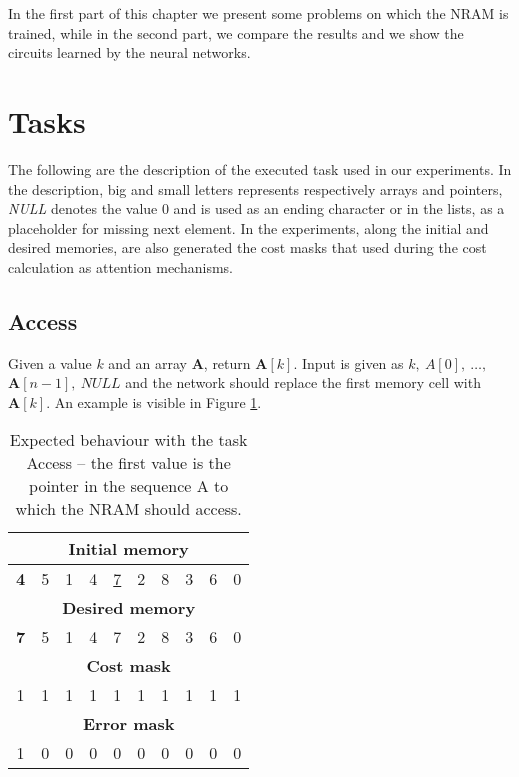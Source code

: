 \label{experiments}
In the first part of this chapter we present some problems on which the NRAM is trained, while in the second part, we compare the results and we show the circuits learned by the neural networks.

\section{Tasks}
The following are the description of the executed task used in our experiments. In the description, big and small letters represents respectively arrays and pointers, \textit{NULL} denotes the value 0 and is used as an ending character or in the lists, as a placeholder for missing next element. In the experiments, along the initial and desired memories, are also generated the cost masks that used during the cost calculation as attention mechanisms.

\subsection{Access}
Given a value $k$ and an array \textbf{A}, return $\textbf{A}[k]$. Input is given as $k,\ A[0],\ \dots,\ $\\$\textbf{A}[n-1],\ \textit{NULL}$ and the network should replace the first memory cell with $\textbf{A}[k]$. An example is visible in Figure \ref{fig:access-example}.
\begin{table}[h!]
	\centering
	\begin{tabular}{|c|c|c|c|c|c|c|c|c|c|}
		\hline
		\multicolumn{10}{|c|}{\textbf{Initial memory}} \\ \hline
		\textbf{4} & 5 & 1 & 4 & \underline{7} & 2 & 8 & 3 & 6 & 0 \\ \hline\hline\hline
		\multicolumn{10}{|c|}{\textbf{Desired memory}} \\ \hline
		\textbf{7} & 5 & 1 & 4 & 7 & 2 & 8 & 3 & 6 & 0 \\ \hline\hline\hline
		\multicolumn{10}{|c|}{\textbf{Cost mask}} \\ \hline
		1 & 1 & 1 & 1 & 1 & 1 & 1 & 1 & 1 & 1 \\ \hline\hline\hline
		\multicolumn{10}{|c|}{\textbf{Error mask}} \\ \hline
		1 & 0 & 0 & 0 & 0 & 0 & 0 & 0 & 0 & 0 \\ \hline
	\end{tabular}
	\caption{Expected behaviour with the task Access -- the first value is the pointer in the sequence A to which the NRAM should access.}
	\label{fig:access-example}
\end{table}
\FloatBarrier
